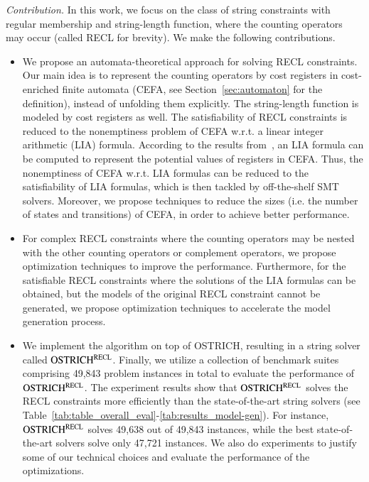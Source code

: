 \medskip
\noindent 
\emph{Contribution.} In this work, we focus on the class of string constraints with regular membership and string-length function, where the counting operators may occur (called RECL for brevity). We make the following contributions.
\begin{itemize}
  \item We propose an automata-theoretical approach for solving RECL constraints.
  Our main idea is to represent the counting operators by cost registers in cost-enriched finite automata (CEFA, see Section~\ref{sec:automaton} for the definition), instead of unfolding them explicitly. The string-length function is modeled by cost registers as well. The satisfiability of RECL constraints is reduced to the nonemptiness problem of CEFA w.r.t. a linear integer arithmetic (LIA) formula. According to the results from~\cite{atva2020}, an LIA formula can be computed to represent the potential values of registers in CEFA.
Thus, the nonemptiness of CEFA w.r.t. LIA formulas can be reduced to the satisfiability of LIA formulas, which is then tackled by off-the-shelf SMT solvers. Moreover, we propose techniques to reduce the sizes (i.e. the number of states and transitions) of CEFA, in order to achieve better performance.
%
  \item For complex RECL constraints where the counting operators may be nested with the other counting operators or complement operators, we propose optimization techniques to improve the performance. Furthermore, for the satisfiable RECL constraints where the solutions of the LIA formulas can be obtained, but the models of the original RECL constraint cannot be generated,  we propose optimization techniques to accelerate the model generation process. 
%
\item We implement the algorithm on top of OSTRICH, resulting in a string solver called $\rm OSTRICH^{RECL}$. Finally, we utilize a collection of benchmark suites comprising 49,843 problem instances in total to evaluate the performance of $\rm OSTRICH^{RECL}$. The experiment results show that $\rm OSTRICH^{RECL}$ solves the RECL constraints more efficiently than the state-of-the-art string solvers (see Table~\ref{tab:table_overall_eval}-\ref{tab:results_model-gen}). For instance, $\rm OSTRICH^{RECL}$ solves 49,638 out of 49,843 instances, while the best state-of-the-art solvers solve only 47,721 instances. We also do experiments to justify some of our technical choices and evaluate the performance of the optimizations. 
%
\end{itemize}


